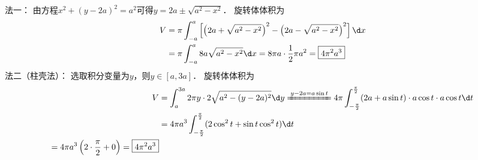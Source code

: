 \documentclass[12pt, a4paper, oneside, UTF8]{ctexbook}
\begin{document}
\begin{solution}
    法一：
    由方程$x^2+(y-2a)^2=a^2$可得$y = 2a \pm \sqrt{a^2-x^2}$．
    旋转体体积为
    \begin{align*}
        V &= \pi \int_{-a}^{a} \left[ \left( 2a + \sqrt{a^2-x^2} \right)^2 - \left( 2a - \sqrt{a^2-x^2} \right)^2 \right] \d x \\
        &= \pi \int_{-a}^{a} 8a\sqrt{a^2-x^2} \d x
        = 8\pi a \cdot \dfrac{1}{2}\pi a^2 = \boxed{4\pi^2 a^3}
    \end{align*}
    法二（柱壳法）：
    选取积分变量为$y$，则$y \in [a, 3a]$．
    旋转体体积为
    \begin{align*}
        V &= \int_{a}^{3a} 2\pi y \cdot 2\sqrt{a^2-(y-2a)^2} \d y
        \xlongequal{y-2a=a\sin t} 4\pi \int_{-\frac{\pi}{2}}^{\frac{\pi}{2}} (2a+a\sin t) \cdot a\cos t \cdot a\cos t \d t \\
        &= 4\pi a^3 \int_{-\frac{\pi}{2}}^{\frac{\pi}{2}} (2\cos^2 t + \sin t \cos^2 t) \d t \\
        = 4\pi a^3 \left( 2 \cdot \frac{\pi}{2} + 0 \right) = \boxed{4\pi^2 a^3}
    \end{align*}
\end{solution}
\end{document}
